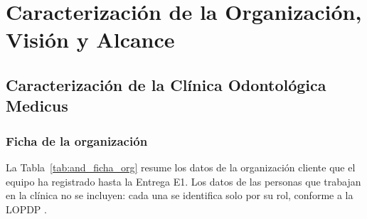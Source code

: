 \documentclass[12pt,a4paper]{article}
\begin{document}
\section{Caracterizaci{\'o}n de la Organizaci{\'o}n, Visi{\'o}n y Alcance}

%

\subsection{Caracterizaci{\'o}n de la Cl{\'i}nica Odontol{\'o}gica Medicus}

\subsubsection{Ficha de la organizaci{\'o}n}

La Tabla~\ref{tab:and_ficha_org} resume los datos de la organizaci{\'o}n cliente que el equipo ha registrado hasta la Entrega E1. Los datos de las personas que trabajan en la cl{\'i}nica no se incluyen: cada una se identifica solo por su rol, conforme a la LOPDP \cite{lopdp2021}.
\end{document}

